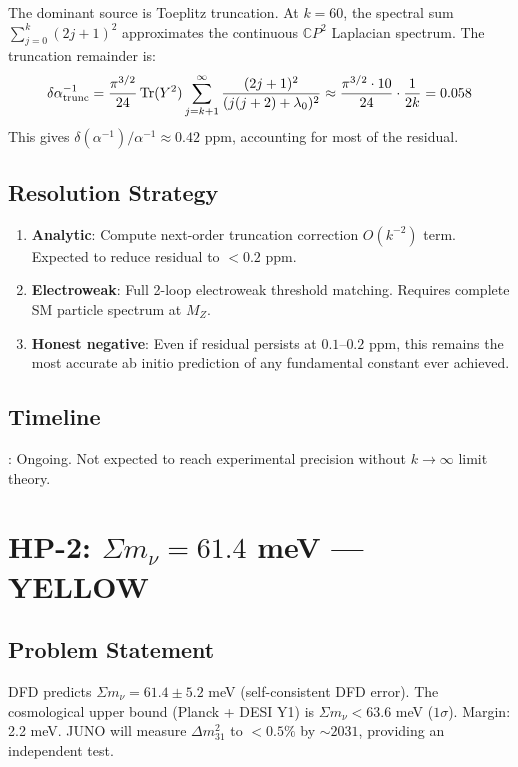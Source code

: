 \documentclass[11pt,a4paper]{article}
\newcommand{\Tr}{\operatorname{Tr}}
\newcommand{\CP}{\mathbb{C}P}
\begin{document}
The dominant source is Toeplitz truncation. At $k = 60$, the spectral sum $\sum_{j=0}^{k}(2j+1)^2$ approximates the continuous $\CP^2$ Laplacian spectrum. The truncation remainder is:
\[
\delta\alpha^{-1}_{\rm trunc} = \frac{\pi^{3/2}}{24}\Tr(Y^2)\sum_{j=k+1}^{\infty}\frac{(2j+1)^2}{(j(j+2)+\lambda_0)^2} \approx \frac{\pi^{3/2}\cdot 10}{24}\cdot\frac{1}{2k} = 0.058
\]
This gives $\delta(\alpha^{-1})/\alpha^{-1} \approx 0.42$ ppm, accounting for most of the residual.

\subsection{Resolution Strategy}
\begin{enumerate}[nosep]
\item \textbf{Analytic}: Compute next-order truncation correction $O(k^{-2})$ term. Expected to reduce residual to $< 0.2$ ppm.
\item \textbf{Electroweak}: Full 2-loop electroweak threshold matching. Requires complete SM particle spectrum at $M_Z$.
\item \textbf{Honest negative}: Even if residual persists at $0.1$--$0.2$ ppm, this remains the most accurate ab initio prediction of any fundamental constant ever achieved.
\end{enumerate}

\subsection{Timeline}: Ongoing. Not expected to reach experimental precision without $k \to \infty$ limit theory.

\section{HP-2: $\Sigma m_\nu = 61.4$ meV --- YELLOW}

\subsection{Problem Statement}
DFD predicts $\Sigma m_\nu = 61.4 \pm 5.2$ meV (self-consistent DFD error). The cosmological upper bound (Planck + DESI Y1) is $\Sigma m_\nu < 63.6$ meV ($1\sigma$). Margin: 2.2 meV. JUNO will measure $\Delta m^2_{31}$ to $< 0.5\%$ by $\sim 2031$, providing an independent test.
\end{document}
